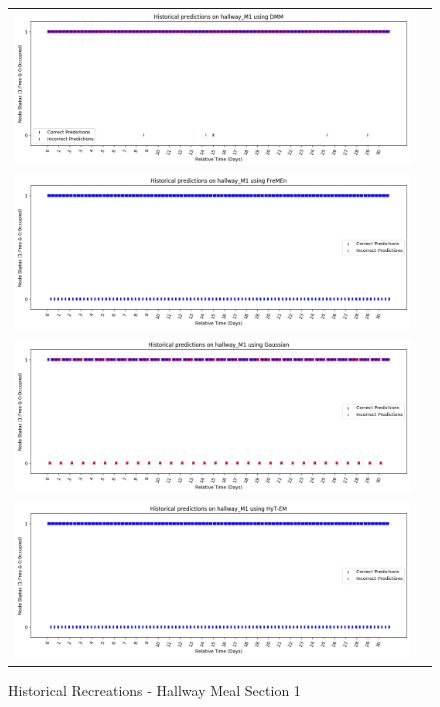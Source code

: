 \begin{center}
\begin{figure}[!Hp]
  \begin{tabular}{cc}
    {\includegraphics[width = 6in]{images/results/Historical_hallway_M1_DMM.png}} \\
    {\includegraphics[width = 6in]{images/results/Historical_hallway_M1_FreMEn.png}} \\
    {\includegraphics[width = 6in]{images/results/Historical_hallway_M1_Gaussian.png}} \\
    {\includegraphics[width = 6in]{images/results/Historical_hallway_M1_HyT-EM.png}} \\
  \end{tabular}
  \caption{Historical Recreations - Hallway Meal Section 1}
\end{figure}


\end{center}
